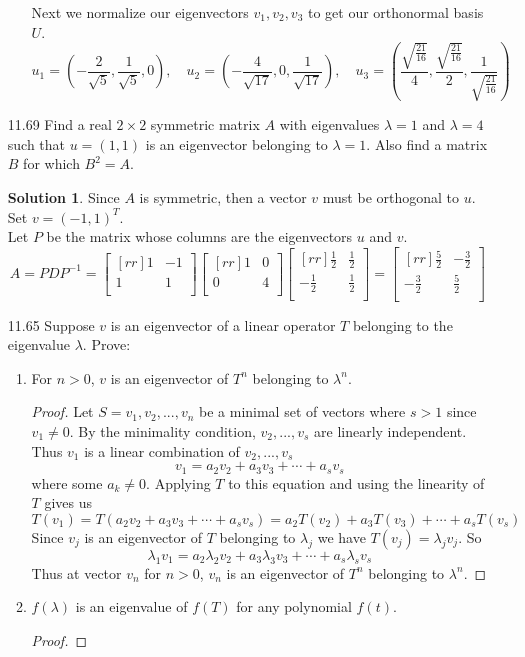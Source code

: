 \documentclass[12pt]{article}
\theoremstyle{definition}
\newtheorem*{solution}{Solution} %
\theoremstyle{plain}
\begin{document}
\begin{enumerate}
\begin{enumerate}
	Next we normalize our eigenvectors $v_1,v_2,v_3$ to get our orthonormal basis $U$.
	\[ u_1=(-\frac{2}{\sqrt{5}},\frac{1}{\sqrt{5}},0),\quad u_2=(-\frac{4}{\sqrt{17}},0,\frac{1}{\sqrt{17}}),\quad u_3=(\frac{\sqrt{\frac{21}{16}}}{4},\frac{\sqrt{\frac{21}{16}}}{2},\frac{1}{\sqrt{\frac{21}{16}}}) \]
	\end{enumerate}
\item[11.69]Find a real $2 \times 2$ symmetric matrix $A$ with eigenvalues $\lambda = 1$ and $\lambda = 4$ such that $u=(1,1)$ is an eigenvector belonging to $\lambda=1$. Also find a matrix $B$ for which $B^2=A$.
	\begin{solution}
	Since $A$ is symmetric, then a vector $v$ must be orthogonal to $u$. Set $v=(-1,1)^T$.\\
	Let $P$ be the matrix whose columns are the eigenvectors $u$ and $v$.
	\[ A=PDP^{-1}=\begin{bmatrix}[rr]1&-1\\1&1\\\end{bmatrix}\begin{bmatrix}[rr]1&0\\0&4\\\end{bmatrix}\begin{bmatrix}[rr]\frac{1}{2}&\frac{1}{2}\\-\frac{1}{2}&\frac{1}{2}\\\end{bmatrix} =  \begin{bmatrix}[rr]\frac{5}{2}&-\frac{3}{2}\\-\frac{3}{2}&\frac{5}{2}\\\end{bmatrix} \]
	\end{solution}
\item[11.65]Suppose $v$ is an eigenvector of a linear operator $T$ belonging to the eigenvalue $\lambda$. Prove:
	\begin{enumerate}
	\item For $n>0$, $v$ is an eigenvector of $T^n$ belonging to $\lambda^n$.
	\begin{proof}
	Let $S=v_1,v_2,...,v_n$ be a minimal set of vectors where $s>1$ since $v_1\neq 0$. By the minimality condition, $v_2,...,v_s$ are linearly independent. Thus $v_1$ is a linear combination of $v_2,...,v_s$
	\[ v_1=a_2v_2+a_3v_3+\cdots +a_sv_s \]
	where some $a_k\neq 0$. Applying $T$ to this equation and using the linearity of $T$ gives us
	\[ T(v_1)=T(a_2v_2+a_3v_3+\cdots +a_sv_s) = a_2T(v_2)+a_3T(v_3)+\cdots +a_sT(v_s) \]
	Since $v_j$ is an eigenvector of $T$ belonging to $\lambda_j$ we have $T(v_j)=\lambda_jv_j$. So
	\[ \lambda_1v_1=a_2\lambda_2v_2+a_3\lambda_3v_3+\cdots +a_s\lambda_sv_s \]
	Thus at vector $v_n$ for $n > 0$, $v_n$ is an eigenvector of $T^n$ belonging to $\lambda^n$.
	\end{proof}
	\item $f(\lambda)$ is an eigenvalue of $f(T)$ for any polynomial $f(t)$.
	\begin{proof}
	

\end{proof}
\end{enumerate}
\end{enumerate}
\end{document}
